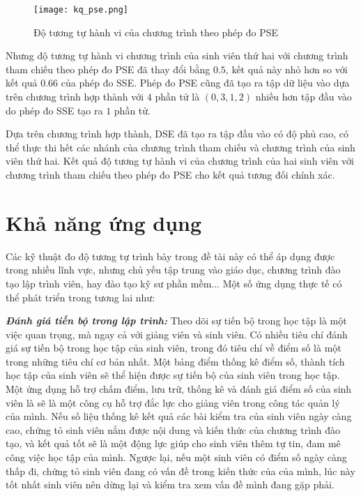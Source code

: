 \begin{figure}[H]	
	\begin{center}
		\texttt{[image: kq\_pse.png]}
	\end{center}
	\caption{Độ tương tự hành vi của chương trình theo phép đo PSE}	
	\label{fig:result-PSE}	
\end{figure}

Nhưng độ tương tự hành vi chương trình của sinh viên thứ hai với chương trình tham chiếu theo phép đo PSE đã thay đổi bằng $ 0.5 $, kết quả này nhỏ hơn so với kết quả $ 0.66 $ của phép đo SSE. Phép đo PSE cũng đã tạo ra tập dữ liệu vào dựa trên chương trình hợp thành với $ 4 $ phần tử là $ (0, 3, 1, 2) $ nhiều hơn tập đầu vào do phép đo SSE tạo ra $ 1 $ phần tử.

Dựa trên chương trình hợp thành, DSE đã tạo ra tập đầu vào có độ phủ cao, có thể thực thi hết các nhánh của chương trình tham chiếu và chương trình của sinh viên thứ hai. Kết quả độ tương tự hành vi của chương trình của hai sinh viên với chương trình tham chiếu theo phép đo PSE cho kết quả tương đối chính xác.

\section{Khả năng ứng dụng}

Các kỹ thuật đo độ tương tự trình bày trong đề tài này có thể áp dụng
được trong nhiều lĩnh vực, nhưng chủ yếu tập trung vào giáo dục, chương trình đào tạo lập trình viên, hay đào tạo kỹ sư phần mềm... Một
số ứng dụng thực tế có thể phát triển trong tương lai như:

\textbf{\textit{Đánh giá tiến bộ trong lập trình:}} Theo dõi sự tiến
bộ trong học tập là một việc quan trọng, mà ngay cả với giảng viên và
sinh viên. Có nhiều tiêu chí đánh giá sự tiến bộ trong học tập của
sinh viên, trong đó tiêu chí về điểm số là một trong những tiêu chí cơ
bản nhất. Một bảng điểm thống kê điểm số, thành tích học tập của sinh
viên sẽ thể hiện được sự tiến bộ của sinh viên trong học tập. Một ứng
dụng hỗ trợ chấm điểm, lưu trữ, thống kê và đánh giá điểm số của sinh
viên là sẽ là một công cụ hỗ trợ đắc lực cho giảng viên trong công tác
quản lý của mình. Nếu số liệu thống kê kết quả các bài kiểm tra của
sinh viên ngày càng cao, chứng tỏ sinh viên nắm được nội dung và kiến
thức của chương trình đào tạo, và kết quả tốt sẽ là một động lực giúp
cho sinh viên thêm tự tin, đam mê công việc học tập của mình. Ngược
lại, nếu một sinh viên có điểm số ngày càng thấp đi, chứng tỏ sinh
viên đang có vấn đề trong kiến thức của của mình, lúc này tốt nhất
sinh viên nên dừng lại và kiểm tra xem vấn đề mình đang gặp phải.

